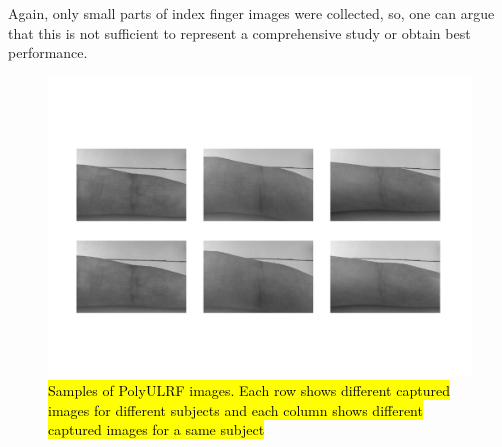 \documentclass[review]{elsarticle}
\begin{document}
	Again, only small parts of index finger images were collected, so, one can argue that this is not sufficient to represent a comprehensive study or obtain best performance.
		\begin{figure}[!h]
			\centering
			\includegraphics[page=1,scale=.47,trim=2cm 4cm 2cm 4cm,clip]{PolyULRF.pdf}
			\caption{\hl{Samples of PolyULRF images. Each row shows different captured images for different subjects and each column shows different captured images for a same subject}}
			\label{fig:PolyULRF}
		\end{figure}
\end{document}
